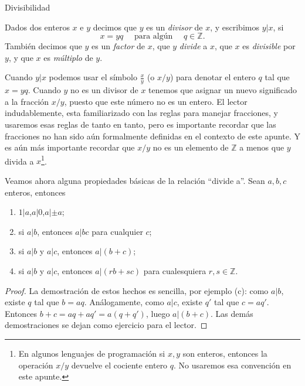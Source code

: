 \begin{section}{Divisibilidad}\label{1.6}


\begin{definicion}Dados dos enteros $x$ e $y$ decimos que $y$ es un {\em divisor} de $x$, y escribimos $y|x$, si
$$
x=yq\quad\text{ para algún }\quad q\in \mathbb Z.
$$
También decimos que $y$ es un {\em factor} de $x$, que $y$ {\em divide} a $x$, que $x$ es {\em divisible} por $y$, y que $x$ es {\em múltiplo} de $y$.
\end{definicion}

Cuando $y|x$ podemos usar el símbolo $\frac{x}{y}$ (o $x/y$) para
denotar el entero $q$ tal que $ x=yq$. Cuando $y$ no es un divisor
de $x$ tenemos que asignar un nuevo significado a la fracción
$x/y$, puesto que este número no es un entero. El lector
indudablemente, esta familiarizado con las reglas para manejar
fracciones, y usaremos esas reglas de tanto en tanto, pero es
importante recordar que las fracciones no han sido aún formalmente
definidas en el contexto de este apunte. Y es aún más importante
recordar que $x/y$ no es un elemento de $\mathbb Z$ a menos que
$y$ divida a $x$\footnote{En algunos lenguajes de programación si $x,y$ son enteros, entonces la operación $x/y$ devuelve el cociente entero $q$. No usaremos esa convención en este apunte.}.


\begin{observacion}\label{prop-divide-a-propiedades} Veamos ahora alguna propiedades básicas de la relación ``divide a''. Sean $a,b,c$ enteros, entonces
\begin{enumerate}[label=(\alph*)]
\item $1|a$,\qquad $a|0$,\qquad $a|\pm a$;
\item si $a|b$, entonces $a|bc$ para cualquier $c$;
\item si $a|b$ y $a|c$, entonces $a|(b+c)$;
\item\label{prop-divide-a-propiedades-item-4} si $a|b$ y $a|c$, entonces $a|(rb+sc)$ para cualesquiera $r,s \in \mathbb Z$.
\end{enumerate}
\begin{proof}
La demostración de estos hechos es sencilla, por ejemplo (c): como $a|b$, existe $q$ tal que $b = aq$. Análogamente, como $a|c$, existe $q'$ tal que $c = aq'$. Entonces $b+c = aq+aq' = a(q+q')$, luego $a|(b+c)$.  
Las demás demostraciones se dejan como ejercicio para el lector. 
\end{proof}
\end{observacion}



\end{section}
